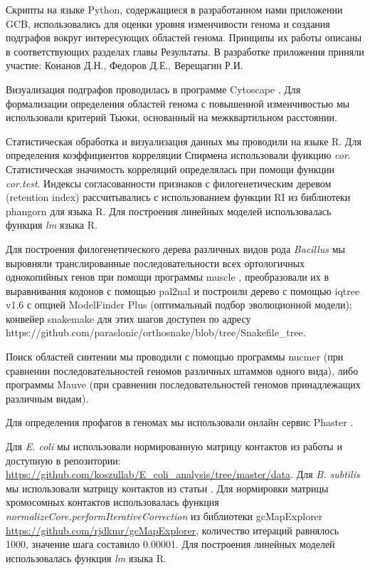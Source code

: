 Скрипты на языке Python, содержащиеся в разработанном нами приложении GCB, использовались для оценки уровня изменчивости генома и создания подграфов вокруг интересующих областей генома. Принципы их работы описаны в соответствующих разделах главы Результаты. В разработке приложения приняли участие: Конанов Д.Н., Федоров Д.Е., Верещагин Р.И.

Визуализация подграфов проводилась в программе Cytoscape \cite{smoot2011cytoscape}. Для формализации определения областей генома с повышенной изменчивостью мы использовали критерий Тьюки, основанный на межквартильном расстоянии.

Статистическая обработка и визуализация данных мы проводили на языке R. Для определения коэффициентов корреляции Спирмена использовали функцию \textit{cor}. Статистическая значимость корреляций определялась при помощи функции \textit{cor.test}. Индексы согласованности признаков с филогенетическим деревом (retention index) рассчитывались с использованием функции RI из библиотеки phangorn для языка R. Для построения линейных моделей использовалась функция \textit{lm} языка R.

Для построения филогенетического дерева различных видов рода \textit{Bacillus} мы выровняли транслированные последовательности всех ортологичных однокопийных генов при помощи программы muscle \cite{edgar2004muscle}, преобразовали их в выравнивания кодонов с помощью pal2nal и построили дерево с помощью iqtree v1.6 \cite{nguyen2015iq} с опцией ModelFinder Plus (оптимальный подбор эволюционной модели); конвейер snakemake для этих шагов доступен по адресу https://github.com/paraslonic/orthosnake/blob/tree/Snakefile\_tree. 

Поиск областей синтении мы проводили с помощью программы nucmer \cite{marccais2018mummer4}(при сравнении последовательностей геномов различных штаммов одного вида), либо программы Mauve \cite{darling2004mauve} (при сравнении последовательностей геномов принадлежащих различным видам).

Для определения профагов в геномах мы использовали онлайн сервис Phaster \cite{arndt2016phaster}. 

Для \textit{E. coli} мы использовали нормированную матрицу контактов из работы \cite{lioy2018multiscale} и доступную в репозитории: \url{https://github.com/koszullab/E_coli_analysis/tree/master/data}. Для \textit{B. subtilis} мы использовали матрицу контактов из статьи \cite{marbouty2015condensin}. Для нормировки матрицы хромосомных контактов использовалась функция  \textit{normalizeCore.performIterativeCorrection} из библиотеки gcMapExplorer \url{https://github.com/rjdkmr/gcMapExplorer}, количество итераций равнялось 1000, значение шага составило 0.00001. Для построения линейных моделей использовалась функция \textit{lm} языка R.


